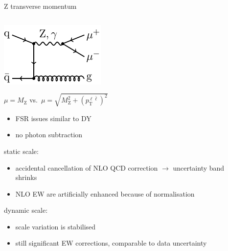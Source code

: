 \begin{frame}[t]{Z transverse momentum}
\begin{columns}[T,onlytextwidth]
\begin{column}{.5\textwidth}
\hspace*{1.5cm}
\includegraphics[height=0.13\textheight]{ew_corrections/figures/fd08_z_pt_born}

\vspace*{0.2cm}

\begin{center}
\alert<1>{$\mu = M_\mathrm{Z}$} vs.\ \alert<2>{$\mu = \sqrt{M_\mathrm{Z}^2 + (p_\mathrm{T}^{\ell \bar{\ell}})^2}$}
\end{center}
\begin{itemize}
\item FSR issues similar to DY
\item no photon subtraction
\end{itemize}
static scale:
\begin{itemize}
\item accidental cancellation of NLO QCD correction $\rightarrow$ uncertainty band shrinks
\item NLO EW are artificially enhanced because of normalisation
\end{itemize}
dynamic scale:
\begin{itemize}
\item scale variation is stabilised
\item still significant EW corrections, comparable to data uncertainty
\end{itemize}
\end{column}
\begin{column}{.5\textwidth}

\end{column}
\end{columns}
\end{frame}
